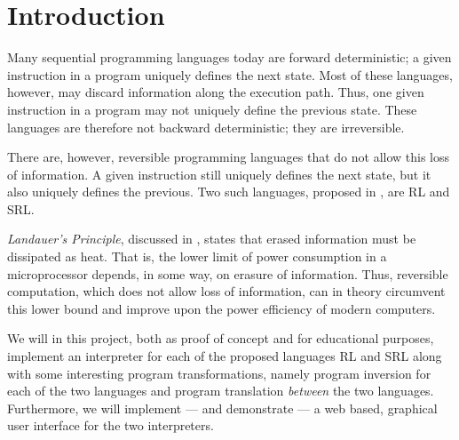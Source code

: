 \chapter*{Introduction}
%

Many sequential programming languages today are forward deterministic; a given instruction in a program uniquely defines the next state. Most of these languages, however, may discard information along the execution path. Thus, one given instruction in a program may not uniquely define the previous state. These languages are therefore not backward deterministic; they are irreversible.

There are, however, reversible programming languages that do not allow this loss of information. A given instruction still uniquely defines the next state, but it also uniquely defines the previous. Two such languages, proposed in \cite{REV}, are RL and SRL.

\textit{Landauer's Principle}, discussed in \cite{LAN}, states that erased information must be dissipated as heat. That is, the lower limit of power consumption in a microprocessor depends, in some way, on erasure of information. Thus, reversible computation, which does not allow loss of information, can in theory circumvent this lower bound and improve upon the power efficiency of modern computers.

We will in this project, both as proof of concept and for educational purposes, implement an interpreter for each of the proposed languages RL and SRL along with some interesting program transformations, namely program inversion for each of the two languages and program translation \textit{between} the two languages. Furthermore, we will implement --- and demonstrate --- a web based, graphical user interface for the two interpreters.
